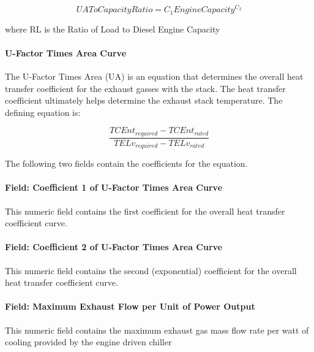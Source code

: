 \begin{equation}
UAToCapacityRatio = {C_1}EngineCapacit{y^{{C_2}}}
\end{equation}

where RL is the Ratio of Load to Diesel Engine Capacity

\paragraph{U-Factor Times Area Curve}\label{u-factor-times-area-curve}

The U-Factor Times Area (UA) is an equation that determines the overall heat transfer coefficient for the exhaust gasses with the stack. The heat transfer coefficient ultimately helps determine the exhaust stack temperature. The defining equation is:

\begin{equation}
\frac{{TCEn{t_{required}} - TCEn{t_{rated}}}}{{TEL{v_{required}} - TEL{v_{rated}}}}
\end{equation}

The following two fields contain the coefficients for the equation.

\paragraph{Field: Coefficient 1 of U-Factor Times Area Curve}\label{field-coefficient-1-of-u-factor-times-area-curve-000}

This numeric field contains the first coefficient for the overall heat transfer coefficient curve.

\paragraph{Field: Coefficient 2 of U-Factor Times Area Curve}\label{field-coefficient-2-of-u-factor-times-area-curve-000}

This numeric field contains the second (exponential) coefficient for the overall heat transfer coefficient curve.

\paragraph{Field: Maximum Exhaust Flow per Unit of Power Output}\label{field-maximum-exhaust-flow-per-unit-of-power-output-000}

This numeric field contains the maximum exhaust gas mass flow rate per watt of cooling provided by the engine driven chiller

